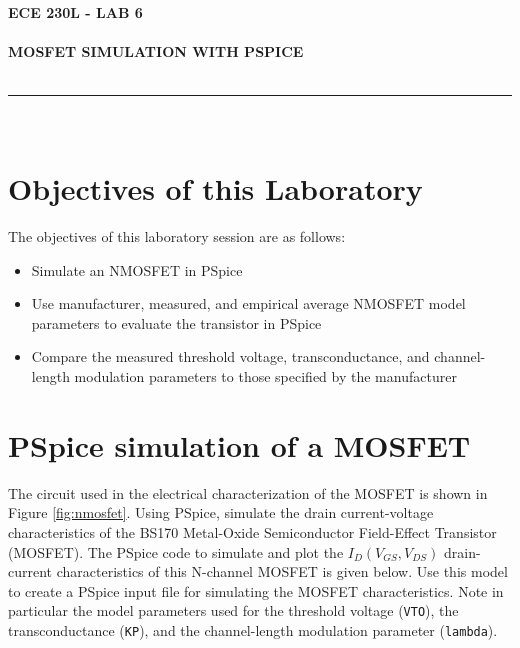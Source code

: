\documentclass[12pt]{../manual}
\begin{document}
\begin{center}
\textbf{\huge ECE 230L - LAB 6}\\~\\
\textbf{\large MOSFET SIMULATION WITH PSPICE}\\~\\
\rule{6.5in}{0.5mm}\\
\end{center}

\tableofcontents

\listoffigures

\newpage
%
\section{Objectives of this Laboratory}
The objectives of this laboratory session are as follows:
\begin{itemize}
\item  Simulate an NMOSFET in PSpice
\item Use manufacturer, measured, and empirical average NMOSFET model parameters to evaluate
the transistor in PSpice
\item Compare the measured threshold voltage, transconductance, and channel-length modulation
parameters to those specified by the manufacturer
\end{itemize}

\section{PSpice simulation of a MOSFET}
The circuit used in the electrical characterization of the MOSFET is shown in Figure \ref{fig:nmosfet}. Using PSpice, simulate the drain current-voltage characteristics of the BS170 Metal-Oxide Semiconductor Field-Effect Transistor (MOSFET). The PSpice code to simulate and plot the $I_D (V_{GS}, V_{DS})$ drain-current characteristics of this N-channel MOSFET is given below. Use this model to create a PSpice input file for simulating the MOSFET characteristics. Note in particular the model parameters used for the threshold voltage ({\tt VTO}), the transconductance ({\tt KP}), and the channel-length modulation parameter ({\tt lambda}).
\end{document}
